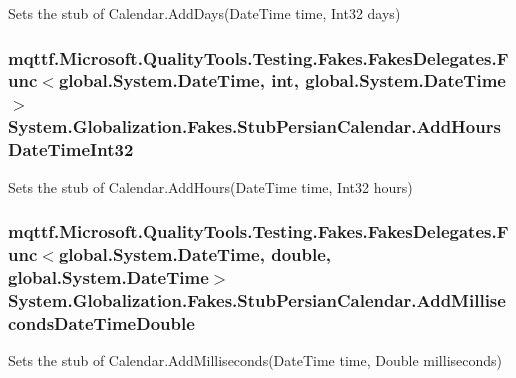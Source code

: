 Sets the stub of Calendar.\-Add\-Days(\-Date\-Time time, Int32 days)

\hypertarget{class_system_1_1_globalization_1_1_fakes_1_1_stub_persian_calendar_a9d1d523769626fb51c3836e273ee3d10}{
\subsubsection[{Add\-Hours\-Date\-Time\-Int32}]{\setlength{\rightskip}{0pt plus 5cm}mqttf.\-Microsoft.\-Quality\-Tools.\-Testing.\-Fakes.\-Fakes\-Delegates.\-Func$<$global.\-System.\-Date\-Time, int, global.\-System.\-Date\-Time$>$ System.\-Globalization.\-Fakes.\-Stub\-Persian\-Calendar.\-Add\-Hours\-Date\-Time\-Int32}}\label{class_system_1_1_globalization_1_1_fakes_1_1_stub_persian_calendar_a9d1d523769626fb51c3836e273ee3d10}


Sets the stub of Calendar.\-Add\-Hours(\-Date\-Time time, Int32 hours)

\hypertarget{class_system_1_1_globalization_1_1_fakes_1_1_stub_persian_calendar_afb5a9c368fce0d2401dd0e8856b7b17d}{
\subsubsection[{Add\-Milliseconds\-Date\-Time\-Double}]{\setlength{\rightskip}{0pt plus 5cm}mqttf.\-Microsoft.\-Quality\-Tools.\-Testing.\-Fakes.\-Fakes\-Delegates.\-Func$<$global.\-System.\-Date\-Time, double, global.\-System.\-Date\-Time$>$ System.\-Globalization.\-Fakes.\-Stub\-Persian\-Calendar.\-Add\-Milliseconds\-Date\-Time\-Double}}\label{class_system_1_1_globalization_1_1_fakes_1_1_stub_persian_calendar_afb5a9c368fce0d2401dd0e8856b7b17d}


Sets the stub of Calendar.\-Add\-Milliseconds(\-Date\-Time time, Double milliseconds)

